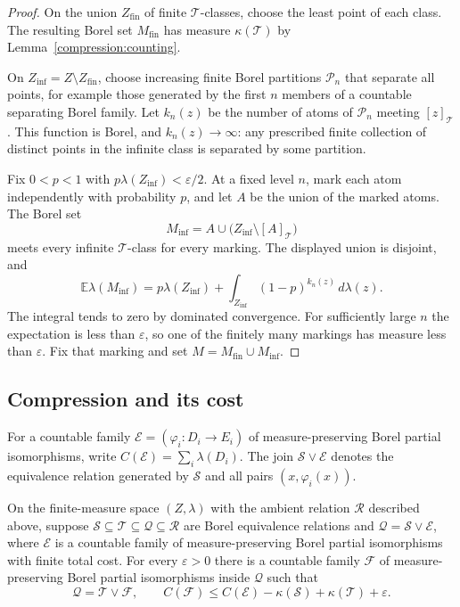 \begin{proof}
On the union $Z_{\mathrm{fin}}$ of finite $\mathcal T$-classes, choose
the least point of each class.  The resulting Borel set
$M_{\mathrm{fin}}$ has measure $\kappa(\mathcal T)$ by
Lemma~\ref{compression:counting}.

On $Z_{\mathrm{inf}}=Z\setminus Z_{\mathrm{fin}}$, choose increasing
finite Borel partitions $\mathcal P_n$ that separate all points, for
example those generated by the first $n$ members of a countable
separating Borel family.  Let $k_n(z)$ be the number of atoms of
$\mathcal P_n$ meeting $[z]_{\mathcal T}$.  This function is Borel, and
$k_n(z)\longrightarrow\infty$: any prescribed finite collection of
distinct points in the infinite class is separated by some partition.

Fix $0<p<1$ with $p\lambda(Z_{\mathrm{inf}})<\varepsilon/2$.
At a fixed level $n$, mark each atom independently with probability $p$,
and let $A$ be the union of the marked atoms.  The Borel set
\[
 M_{\mathrm{inf}}
 =A\cup\bigl(Z_{\mathrm{inf}}\setminus[A]_{\mathcal T}\bigr)
\]
meets every infinite $\mathcal T$-class for every marking.  The displayed
union is disjoint, and
\[
 \mathbb E\lambda(M_{\mathrm{inf}})
 =p\lambda(Z_{\mathrm{inf}})
   +\int_{Z_{\mathrm{inf}}}(1-p)^{k_n(z)}\,d\lambda(z).
\]
The integral tends to zero by dominated convergence.  For sufficiently
large $n$ the expectation is less than $\varepsilon$, so one of the
finitely many markings has measure less than $\varepsilon$.  Fix that
marking and set $M=M_{\mathrm{fin}}\cup M_{\mathrm{inf}}$.
\end{proof}

\subsection{Compression and its cost}

For a countable family $\mathcal E=(\varphi_i:D_i\to E_i)$ of
measure-preserving Borel partial isomorphisms, write
$C(\mathcal E)=\sum_i\lambda(D_i)$.  The join
$\mathcal S\vee\mathcal E$ denotes the equivalence relation generated
by $\mathcal S$ and all pairs $(x,\varphi_i(x))$.

\begin{lemma}[Compression]\label{compression:main}\label{compression:lemma}
On the finite-measure space $(Z,\lambda)$ with the ambient relation
$\mathcal R$ described above, suppose
$\mathcal S\subseteq\mathcal T\subseteq\mathcal Q\subseteq
\mathcal R$ are Borel equivalence relations and
$\mathcal Q=\mathcal S\vee\mathcal E$, where $\mathcal E$ is a
countable family of measure-preserving Borel partial isomorphisms with
finite total cost.  For every $\varepsilon>0$ there is a countable
family $\mathcal F$ of measure-preserving Borel partial isomorphisms
inside $\mathcal Q$ such that
\begin{equation}\label{compression:bound}
 \mathcal Q=\mathcal T\vee\mathcal F,
 \qquad
 C(\mathcal F)\leq C(\mathcal E)-\kappa(\mathcal S)
                          +\kappa(\mathcal T)+\varepsilon.
\end{equation}
\end{lemma}

